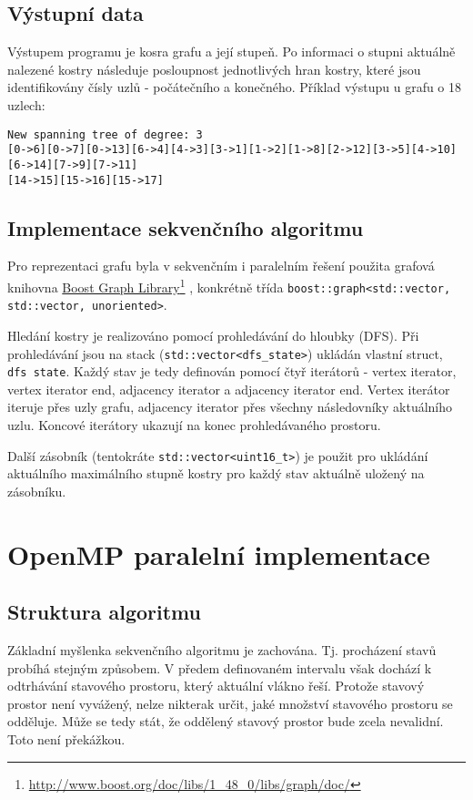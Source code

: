 \documentclass[]{article}
\newcommand\fnurl[2]{%
  \href{#2}{#1}\footnote{\url{#2}}%
}
\begin{document}
\subsection{Výstupní data}
Výstupem programu je kosra grafu a její stupeň. Po informaci o stupni aktuálně nalezené kostry následuje posloupnost jednotlivých hran kostry, které jsou identifikovány čísly uzlů - počátečního a konečného. Příklad výstupu u grafu o 18 uzlech:

\begin{verbatim}
New spanning tree of degree: 3
[0->6][0->7][0->13][6->4][4->3][3->1][1->2][1->8][2->12][3->5][4->10][6->14][7->9][7->11]
[14->15][15->16][15->17]
\end{verbatim}

\subsection{Implementace sekvenčního algoritmu}
Pro reprezentaci grafu byla v sekvenčním i paralelním řešení použita grafová knihovna \fnurl{Boost Graph Library}{http://www.boost.org/doc/libs/1_48_0/libs/graph/doc/}, konkrétně třída \verb|boost::graph<std::vector, std::vector, unoriented>|.

Hledání kostry je realizováno pomocí prohledávání do hloubky (DFS). Při prohledávání jsou na stack (\verb|std::vector<dfs_state>|) ukládán vlastní struct, \verb|dfs state|. Každý stav je tedy definován pomocí čtyř iterátorů - vertex iterator, vertex iterator end, adjacency iterator a adjacency iterator end. Vertex iterátor iteruje přes uzly grafu, adjacency iterator přes všechny následovníky aktuálního uzlu. Koncové iterátory ukazují na konec prohledávaného prostoru.

Další zásobník (tentokráte \verb|std::vector<uint16_t>|) je použit pro ukládání aktuálního maximálního stupně kostry pro každý stav aktuálně uložený na zásobníku.

\section{OpenMP paralelní implementace}

\subsection{Struktura algoritmu}

Základní myšlenka sekvenčního algoritmu je zachována. Tj. procházení stavů probíhá stejným způsobem. V předem definovaném intervalu však dochází k odtrhávání stavového prostoru, který aktuální vlákno řeší. Protože stavový prostor není vyvážený, nelze nikterak určit, jaké množství stavového prostoru se odděluje. Může se tedy stát, že oddělený stavový prostor bude zcela nevalidní. Toto není překážkou.
\end{document}
